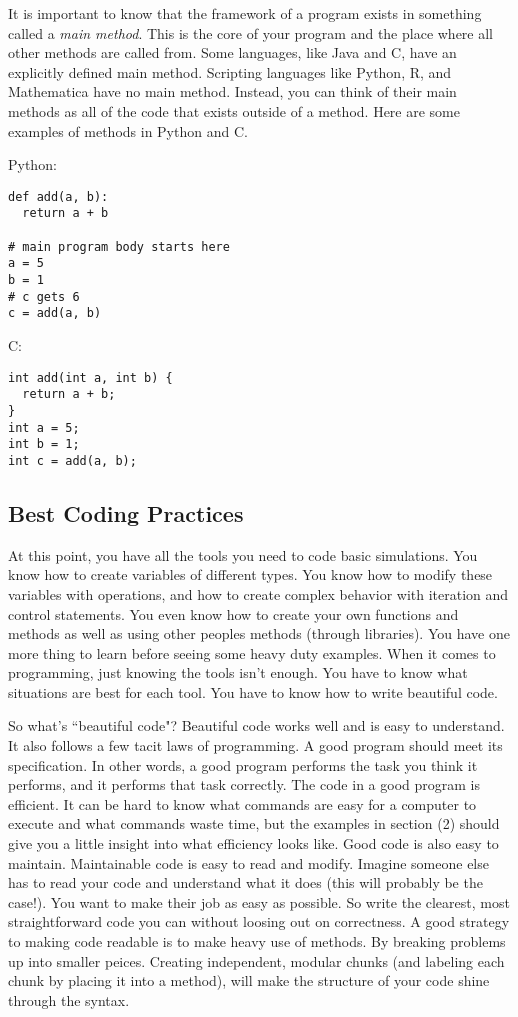 \documentclass[a4paper]{article}
\begin{document}
It \ex is important to know that the framework of a program exists in something called a {\it main method}. This is the core of your program and the place where all other methods are called from. Some languages, like Java and C, have an explicitly defined main method. Scripting languages like Python, R, and Mathematica have no main method. Instead, you can think of their main methods as all of the code that exists outside of a method. Here are some examples of methods in Python and C.

Python:
\begin{verbatim}
def add(a, b):
  return a + b

# main program body starts here
a = 5
b = 1
# c gets 6
c = add(a, b)
\end{verbatim}
C:
\begin{verbatim}
int add(int a, int b) {
  return a + b;
}
int a = 5;
int b = 1;
int c = add(a, b);
\end{verbatim}


\subsection{Best Coding Practices}

At this point, you have all the tools you need to code basic simulations. You know how to create variables of different types. You know how to modify these variables with operations, and how to create complex behavior with iteration and control statements. You even know how to create your own functions and methods as well as using other peoples methods (through libraries). You have one more thing to learn before seeing some heavy duty examples. When it comes to programming, just knowing the tools isn't enough. You have to know what situations are best for each tool. You have to know how to write beautiful code.

So what's ``beautiful code"? Beautiful code works well and is easy to understand. It also follows a few tacit laws of programming. A good program should meet its specification. In other words, a good program performs the task you think it performs, and it performs that task correctly. The code in a good program is efficient. It can be hard to know what commands are easy for a computer to execute and what commands waste time, but the examples in section (2) should give you a little insight into what efficiency looks like. Good code is also easy to maintain. Maintainable code is easy to read and modify. Imagine someone else has to read your code and understand what it does (this will probably be the case!). You want to make their job as easy as possible. So write the clearest, most straightforward code you can without loosing out on correctness. A good strategy to making code readable is to make heavy use of methods. By breaking problems up into smaller peices. Creating independent, modular chunks (and labeling each chunk by placing it into a method), will make the structure of your code shine through the syntax.
\end{document}
